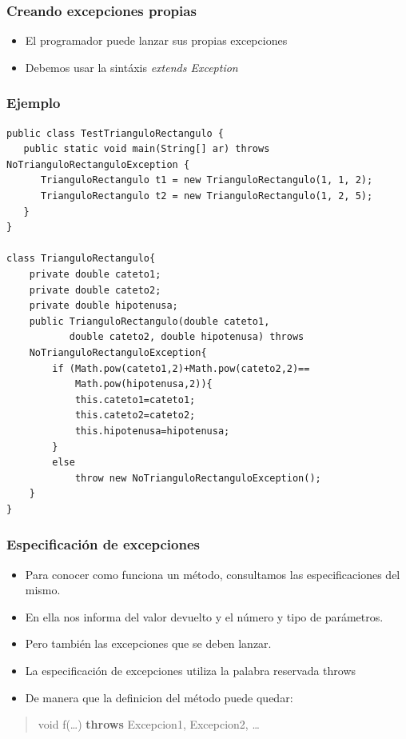 \documentclass{beamer}
\begin{document}
\begin{frame}[fragile]
\frametitle{Creando excepciones propias}
\begin{itemize}[<+->]
\item El programador puede lanzar sus propias excepciones
\item Debemos usar la sintáxis \emph{extends Exception}
\end{itemize}
\end{frame}

\begin{frame}[fragile]
\frametitle{Ejemplo}
\begin{scriptsize}

\begin{verbatim}
public class TestTrianguloRectangulo {
   public static void main(String[] ar) throws NoTrianguloRectanguloException {
      TrianguloRectangulo t1 = new TrianguloRectangulo(1, 1, 2);
      TrianguloRectangulo t2 = new TrianguloRectangulo(1, 2, 5);
   }
}

class TrianguloRectangulo{
    private double cateto1;
    private double cateto2;
    private double hipotenusa;
    public TrianguloRectangulo(double cateto1,
           double cateto2, double hipotenusa) throws
    NoTrianguloRectanguloException{
        if (Math.pow(cateto1,2)+Math.pow(cateto2,2)==
            Math.pow(hipotenusa,2)){
            this.cateto1=cateto1;
            this.cateto2=cateto2;
            this.hipotenusa=hipotenusa;
        }
        else
            throw new NoTrianguloRectanguloException();
    }
}
\end{verbatim}

\end{scriptsize}
\end{frame}


\begin{frame}
\frametitle{Especificación de excepciones}
\begin{itemize}[<+->]
\item Para conocer como funciona un método, consultamos las especificaciones del mismo.
\item En ella nos informa del valor devuelto y el número y tipo de parámetros.
\item Pero también las excepciones que se deben lanzar.
\item La especificación de excepciones utiliza la palabra reservada \alert{throws}
\item De manera que la definicion del método puede quedar:
\end{itemize}
\pause
\begin{quote}
void f(\dots) \textbf{throws} Excepcion1, Excepcion2, \dots
\end{quote}
\end{frame}
\end{document}
